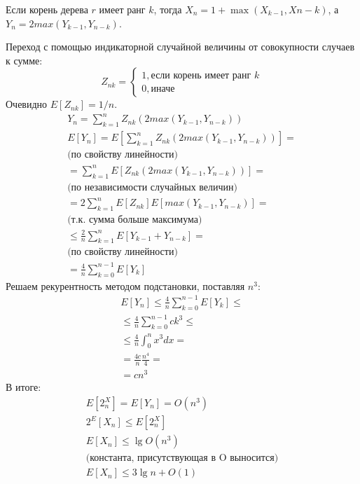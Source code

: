 \documentclass[11pt]{article}
\begin{document}
Если корень дерева $r$ имеет ранг $k$, тогда $X_n = 1 + \max(X_{k-1}, X{n-k})$, а $Y_n = 2max(Y_{k-1}, Y_{n-k})$.

Переход с помощью индикаторной случайной величины от совокупности случаев к сумме:
\begin{equation*}
  Z_{nk} = \begin{cases}
      1, \text{если корень имеет ранг } k\\
      0, \text{иначе}
  \end{cases}
\end{equation*}
Очевидно $E[Z_{nk}] = 1 / n$.
\begin{align*}
  Y_n = \sum_{k=1}^{n} Z_{nk} (2max(Y_{k-1}, Y_{n-k})) \\
  E[Y_n] = E[\sum_{k=1}^{n} Z_{nk} (2max(Y_{k-1}, Y_{n-k})) ] = \\
  \text{(по свойству линейности)} \\
  = \sum_{k=1}^{n} E[Z_{nk} (2max(Y_{k-1}, Y_{n-k}))] = \\
  \text{(по независимости случайных величин)} \\
  = 2 \sum_{k=1}^{n} E[Z_{nk}] E[max(Y_{k-1}, Y_{n-k})] = \\
  \text{(т.к. сумма больше максимума)} \\
  \leqslant \frac{2}{n} \sum_{k=1}^{n} E[Y_{k-1} + Y_{n-k}] = \\
  \text{(по свойству линейности)} \\
  = \frac{4}{n}\sum_{k=0}^{n-1}E[Y_k]
\end{align*}
Решаем рекурентность методом подстановки, поставляя $n^3$:
\begin{align*}
  E[Y_n] \leqslant \frac{4}{n}\sum_{k=0}^{n-1}E[Y_k] \leqslant \\
  \leqslant \frac{4}{n}\sum_{k=0}^{n-1}c k^3 \leqslant \\
  \leqslant \frac{4}{n}\int_{0}^{n}x^3 dx = \\
  = \frac{4c}{n} \frac{n^4}{4} = \\
  = c n^3
\end{align*}
В итоге:
\begin{align*}
  E[2^X_n] = E[Y_n] = O(n^3) \\
  2^E[X_n] \leqslant E[2^X_n] \\
  E[X_n] \leqslant \lg O(n^3) \\
  \text{(константа, присутствующая в O выносится)} \\
  E[X_n] \leqslant 3 \lg n + O(1) \\
\end{align*}
\end{document}
